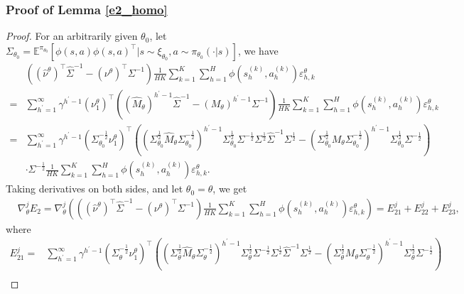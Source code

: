 \documentclass{article}
\numberwithin{equation}{section}
\begin{document}
\subsubsection{Proof of Lemma \ref{e2_homo}}
\begin{proof}
For an arbitrarily given $\theta_0$, let $\Sigma_{\theta_0}=\mathbb{E}^{\pi_{\theta_0}}[\phi(s,a)\phi(s,a)^\top\vert s\sim\xi_{\theta_0},a\sim\pi_{\theta_0}(\cdot\vert s)]$, we have
\begin{align*}
    &\left(\left(\widehat{\nu}^\theta\right)^\top\widehat{\Sigma}^{-1}-\left(\nu^\theta\right)^\top\Sigma^{-1}\right)\frac{1}{HK}\sum_{k=1}^K\sum_{h=1}^H\phi\left(s_h^{(k)},a_h^{(k)}\right)\varepsilon_{h,k}^\theta\\
    =&\sum_{h^\prime=1}^\infty\gamma^{h^\prime-1}\left(\nu^\theta_1\right)^\top\left(\left(\widehat{M}_\theta\right)^{h^\prime-1}\widehat{\Sigma}^{-1}-\left(M_\theta\right)^{h^\prime-1}\Sigma^{-1}\right)\frac{1}{HK}\sum_{k=1}^K\sum_{h=1}^H\phi\left(s_h^{(k)},a_h^{(k)}\right)\varepsilon_{h,k}^\theta\\
    =&\sum_{h^\prime=1}^\infty\gamma^{h^\prime-1}\left(\Sigma_{\theta_0}^{-\frac{1}{2}}\nu^\theta_1\right)^\top\left(\left(\Sigma_{\theta_0}^{\frac{1}{2}}\widehat{M}_\theta\Sigma_{\theta_0}^{-\frac{1}{2}}\right)^{h^\prime-1}\Sigma_{\theta_0}^{\frac{1}{2}}\Sigma^{-\frac{1}{2}}\Sigma^{\frac{1}{2}}\widehat{\Sigma}^{-1}\Sigma^{\frac{1}{2}}-\left(\Sigma_{\theta_0}^{\frac{1}{2}}M_\theta\Sigma_{\theta_0}^{-\frac{1}{2}}\right)^{h^\prime-1}\Sigma_{\theta_0}^{\frac{1}{2}}\Sigma^{-\frac{1}{2}}\right)\\
    &\cdot\Sigma^{-\frac{1}{2}}\frac{1}{HK}\sum_{k=1}^K\sum_{h=1}^H\phi\left(s_h^{(k)},a_h^{(k)}\right)\varepsilon_{h,k}^\theta.
\end{align*}
Taking derivatives on both sides, and let $\theta_0=\theta$, we get
\begin{align*}
    &\nabla_\theta^j E_2=\nabla_\theta^j\left(\left(\left(\widehat{\nu}^\theta\right)^\top\widehat{\Sigma}^{-1}-\left(\nu^\theta\right)^\top\Sigma^{-1}\right)\frac{1}{HK}\sum_{k=1}^K\sum_{h=1}^H\phi\left(s_h^{(k)},a_h^{(k)}\right)\varepsilon_{h,k}^\theta\right)=E_{21}^j+E_{22}^j+E_{23}^j,
\end{align*}
where 
\begin{align*}
    E_{21}^j=&\sum_{h^\prime=1}^\infty\gamma^{h^\prime-1}\left(\Sigma_\theta^{-\frac{1}{2}}\nu^\theta_1\right)^\top\left(\left(\Sigma_\theta^{\frac{1}{2}}\widehat{M}_\theta\Sigma_\theta^{-\frac{1}{2}}\right)^{h^\prime-1}\Sigma_\theta^{\frac{1}{2}}\Sigma^{-\frac{1}{2}}\Sigma^{\frac{1}{2}}\widehat{\Sigma}^{-1}\Sigma^{\frac{1}{2}}-\left(\Sigma_\theta^{\frac{1}{2}}M_\theta\Sigma_\theta^{-\frac{1}{2}}\right)^{h^\prime-1}\Sigma_\theta^{\frac{1}{2}}\Sigma^{-\frac{1}{2}}\right)\\

\end{align*}
\end{proof}
\end{document}
